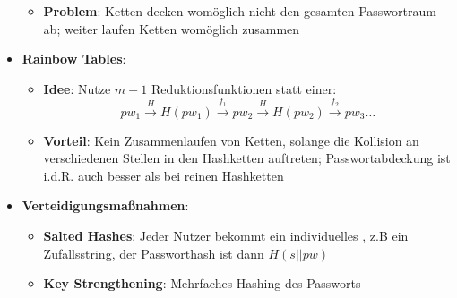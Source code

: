 \begin{itemize}
\begin{itemize}
		\item \textbf{Problem}: Ketten decken womöglich nicht den gesamten Passwortraum ab; weiter laufen Ketten womöglich zusammen
	\end{itemize}
	\item \textbf{Rainbow Tables}:
	\begin{itemize}
		\item \textbf{Idee}: Nutze $m - 1$ Reduktionsfunktionen statt einer:
		$$
			pw_1 \xrightarrow{H} H(pw_1) \xrightarrow{f_1} pw_2 \xrightarrow{H} H(pw_2) \xrightarrow{f_2} pw_3 \dots			
		$$
		\item \textbf{Vorteil}: Kein Zusammenlaufen von Ketten, solange die Kollision an verschiedenen Stellen in den Hashketten auftreten; Passwortabdeckung ist i.d.R. auch besser als bei reinen Hashketten
	\end{itemize}
	\item \textbf{Verteidigungsmaßnahmen}:
	\begin{itemize}
		\item \textbf{Salted Hashes}: Jeder Nutzer bekommt ein individuelles , z.B ein Zufallsstring, der Passworthash ist dann $H(s||pw)$
		\item \textbf{Key Strengthening}: Mehrfaches Hashing des Passworts
	\end{itemize}
\end{itemize}